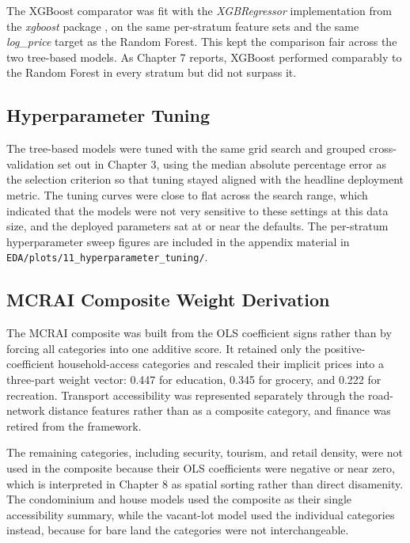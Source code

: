 The XGBoost comparator was fit with the \emph{XGBRegressor} implementation from the \emph{xgboost} package \parencite{chen2016}, on the same per-stratum feature sets and the same \emph{log\_price} target as the Random Forest. This kept the comparison fair across the two tree-based models. As Chapter 7 reports, XGBoost performed comparably to the Random Forest in every stratum but did not surpass it.


\subsection{Hyperparameter Tuning}\label{hyperparameter-tuning-ch6}

The tree-based models were tuned with the same grid search and grouped cross-validation set out in Chapter 3, using the median absolute percentage error as the selection criterion so that tuning stayed aligned with the headline deployment metric. The tuning curves were close to flat across the search range, which indicated that the models were not very sensitive to these settings at this data size, and the deployed parameters sat at or near the defaults. The per-stratum hyperparameter sweep figures are included in the appendix material in \texttt{EDA/plots/11\_hyperparameter\_tuning/}.


\subsection{MCRAI Composite Weight Derivation}\label{mcrai-stage2-weight-derivation}

The MCRAI composite was built from the OLS coefficient signs rather than by forcing all categories into one additive score. It retained only the positive-coefficient household-access categories and rescaled their implicit prices into a three-part weight vector: 0.447 for education, 0.345 for grocery, and 0.222 for recreation. Transport accessibility was represented separately through the road-network distance features rather than as a composite category, and finance was retired from the framework.

The remaining categories, including security, tourism, and retail density, were not used in the composite because their OLS coefficients were negative or near zero, which is interpreted in Chapter 8 as spatial sorting rather than direct disamenity. The condominium and house models used the composite as their single accessibility summary, while the vacant-lot model used the individual categories instead, because for bare land the categories were not interchangeable.

